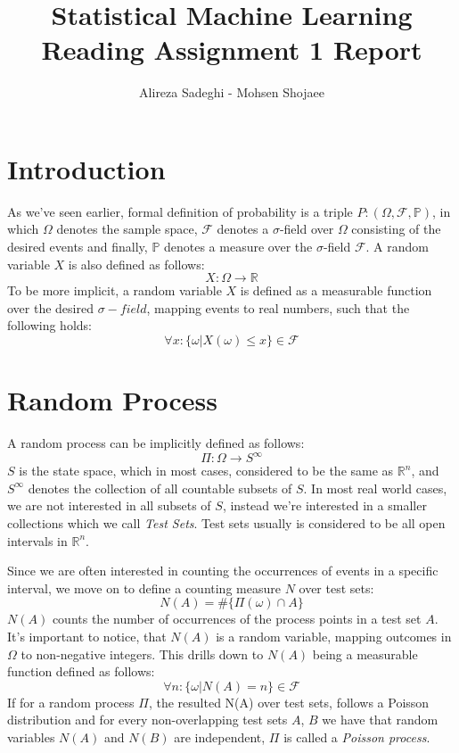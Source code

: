 \documentclass{article}
\title{Statistical Machine Learning \\ Reading Assignment 1 Report}
\author{Alireza Sadeghi - Mohsen Shojaee}
\begin{document}
\maketitle
    
\section{Introduction}

As we've seen earlier, formal definition of probability is a triple $P: (\Omega, \mathcal{F}, \mathbb{P})$, in which $\Omega$ denotes the sample space, $\mathcal{F}$ denotes a $\sigma$-field over $\Omega$ consisting of the desired events and finally, $\mathbb{P}$ denotes a measure over the $\sigma$-field  $\mathcal{F}$.
A random variable $X$ is also defined as follows: $$ X: \Omega \rightarrow \mathbb{R} $$
To be more implicit, a random variable $X$ is defined as a measurable function over the desired $\sigma-field$, mapping events to real numbers, such that the following holds: $$ \forall x: \{\omega|X(\omega) \leq x \} \in \mathcal{F}$$

\section{Random Process}

A random process can be implicitly defined as follows: $$ \Pi: \Omega \rightarrow S^\infty $$
$S$ is the state space, which in most cases, considered to be the same as $\mathbb{R}^n$, and $S^\infty$ denotes the collection of all countable subsets of $S$.
In most real world cases, we are not interested in all subsets of $S$, instead we're interested in a smaller collections which we call \textit{Test Sets}. Test sets usually is considered to be all open intervals in $\mathbb{R}^n$. 

Since we are often interested in counting the occurrences of events in a specific interval, we move on to define a counting measure $N$ over test sets:
$$ N(A) = \# \{\Pi(\omega) \cap A\} $$
$N(A)$ counts the number of occurrences of the process points in a test set $A$. It's important to notice, that $N(A)$ is a random variable, mapping outcomes in $\Omega$ to non-negative integers. This drills down to $N(A)$ being a measurable function defined as follows:
$$ \forall n: \{ \omega | N(A)=n\} \in \mathcal{F}$$ 
If for a random process $\Pi$, the resulted N(A) over test sets, follows a Poisson distribution and for every non-overlapping test sets $A$, $B$ we have that random variables $N(A)$ and $N(B)$ are independent, $\Pi$ is called a \textit{Poisson process}.
\end{document}
